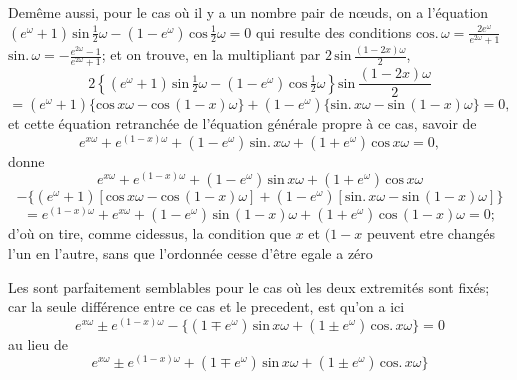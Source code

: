 \documentclass[11pt,a4paper]{article}
\begin{document}
Demême aussi, pour le cas où il y a un nombre pair de nœuds, on
a l'équation $(e^{\omega} + 1)\,\text{sin}\,\frac{1}{2}\omega - (1 - e^{\omega})\,\text{cos}\,\frac{1}{2}\omega = 0$ qui resulte des conditions $\text{cos}.\,\omega = \frac{2e^{\omega}}{e^{2\omega} + 1}$
$\text{sin}.\,\omega = -\frac{e^{2\omega} - 1}{e^{2\omega} + 1}$; et on trouve, en la multipliant par $2\,\text{sin}\,\frac{(1-2x)\omega}{2}$,
\[ 2\left\{(e^{\omega} + 1)\,\text{sin}\,\tfrac{1}{2}\omega - (1 - e^{\omega})\,\text{cos}\,\tfrac{1}{2}\omega\right\}\text{sin}\,\frac{(1-2x)\omega}{2} \]
\[ = (e^{\omega} + 1)\{\text{cos}\,x\omega - \text{cos}\,(1-x)\omega\} + (1 - e^{\omega})\{\text{sin}.\,x\omega - \text{sin}\,(1-x)\omega\} = 0, \]
et cette équation retranchée de l'équation générale propre à ce cas, savoir de
\[ e^{x\omega} + e^{(1-x)\omega} + (1 - e^{\omega})\,\text{sin}.\,x\omega + (1 + e^{\omega})\,\text{cos}\,x\omega = 0, \]
donne
\[ e^{x\omega} + e^{(1-x)\omega} + (1 - e^{\omega})\,\text{sin}\,x\omega + (1 + e^{\omega})\,\text{cos}\,x\omega \]
\[ - \{(e^{\omega} + 1)[\text{cos}\,x\omega - \text{cos}\,(1-x)\omega] + (1 - e^{\omega})[\text{sin}.\,x\omega - \text{sin}\,(1-x)\omega]\} \]
\[ = e^{(1-x)\omega} + e^{x\omega} + (1 - e^{\omega})\,\text{sin}\,(1-x)\omega + (1 + e^{\omega})\,\text{cos}\,(1-x)\omega = 0; \]
d'où on tire, comme cidessus, la condition que $x$ et $(1-x$ peuvent etre changés
l'un en l'autre, sans que l'ordonnée cesse d'être egale a zéro

Les  sont parfaitement semblables pour le cas où les deux extremités
sont fixés; car la seule différence entre ce cas et le precedent, est qu'on a ici
\[ e^{x\omega} \pm e^{(1-x)\omega} - \{(1 \mp e^{\omega})\,\text{sin}\,x\omega + (1 \pm e^{\omega})\,\text{cos}.\,x\omega\} = 0 \]
au lieu de
\[ e^{x\omega} \pm e^{(1-x)\omega} + (1 \mp e^{\omega})\,\text{sin}\,x\omega + (1 \pm e^{\omega})\,\text{cos}.\,x\omega\} \]
\end{document}
